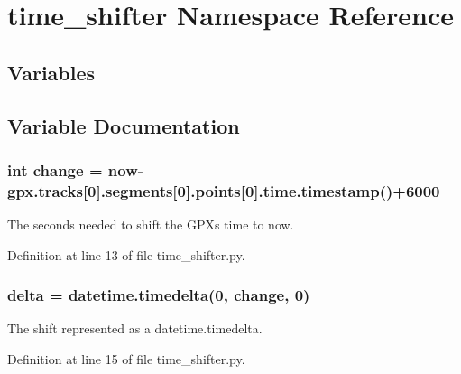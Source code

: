 \hypertarget{namespacetime__shifter}{}\section{time\+\_\+shifter Namespace Reference}
\label{namespacetime__shifter}
\subsection*{Variables}


\subsection{Variable Documentation}
\subsubsection[{\texorpdfstring{change}{change}}]{\setlength{\rightskip}{0pt plus 5cm}int change = {\bf now}-\/gpx.\+tracks\mbox{[}0\mbox{]}.segments\mbox{[}0\mbox{]}.points\mbox{[}0\mbox{]}.time.\+timestamp()+6000}\hypertarget{namespacetime__shifter_ac710c7bfde8686dcdfa07f1800ab01b5}{}\label{namespacetime__shifter_ac710c7bfde8686dcdfa07f1800ab01b5}


The seconds needed to shift the G\+PX\textquotesingle{}s time to now. 



Definition at line 13 of file time\+\_\+shifter.\+py.

\subsubsection[{\texorpdfstring{delta}{delta}}]{\setlength{\rightskip}{0pt plus 5cm}delta = datetime.\+timedelta(0, {\bf change}, 0)}\hypertarget{namespacetime__shifter_a66db7c5e4e9699c54207ab857ae72cb7}{}\label{namespacetime__shifter_a66db7c5e4e9699c54207ab857ae72cb7}


The shift represented as a datetime.\+timedelta. 



Definition at line 15 of file time\+\_\+shifter.\+py.

